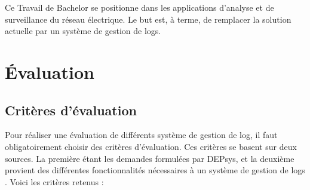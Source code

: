 \documentclass[paper=a4, fontsize=11pt]{scrartcl}
\begin{document}
Ce Travail de Bachelor se positionne dans les applications d'analyse et de surveillance du réseau électrique. Le but est, à terme, de remplacer la solution actuelle par un système de gestion de logs.

\newpage

\section{Évaluation}

\subsection{Critères d'évaluation}

Pour réaliser une évaluation de différents système de gestion de log, il faut obligatoirement choisir des critères d'évaluation. Ces critères se basent sur deux sources. La première étant les demandes formulées par DEPsys, et la deuxième provient des différentes fonctionnalités nécessaires à un système de gestion de logs \cite{noauthor_what_nodate} \cite{noauthor_gestion_2019}. Voici les critères retenus :
\end{document}
